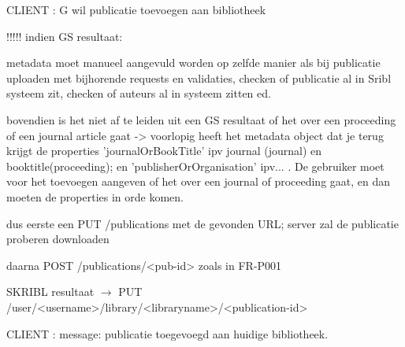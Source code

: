 \documentclass{article}
\begin{document}
\begin{description}
\item CLIENT :  G wil publicatie toevoegen aan bibliotheek
	\begin{description}
	\item !!!!!   indien GS resultaat: 
		\begin{description}
		\item metadata moet manueel aangevuld worden op zelfde manier als bij publicatie uploaden met bijhorende requests en validaties, checken of publicatie al in Sribl systeem zit, checken of auteurs al in systeem zitten ed. 
		\item bovendien is het niet af te leiden uit een GS resultaat of het over een proceeding of een journal article gaat -> voorlopig heeft het metadata object dat je terug krijgt de properties 'journalOrBookTitle'  ipv journal (journal) en booktitle(proceeding); en 'publisherOrOrganisation' ipv... . De gebruiker moet voor het toevoegen aangeven of het over een journal of proceeding gaat, en dan moeten de properties in orde komen.  
		\item dus eerste een PUT /publications met de gevonden URL; server zal de publicatie proberen downloaden 
		\item daarna POST /publications/<pub-id> zoals in FR-P001
		\end{description}
	\item SKRIBL resultaat $\rightarrow$ PUT /user/<username>/library/<libraryname>/<publication-id>
	\end{description}
			
\item CLIENT :  message: publicatie toegevoegd aan huidige bibliotheek.

 \end{description}
 
\end{document}
